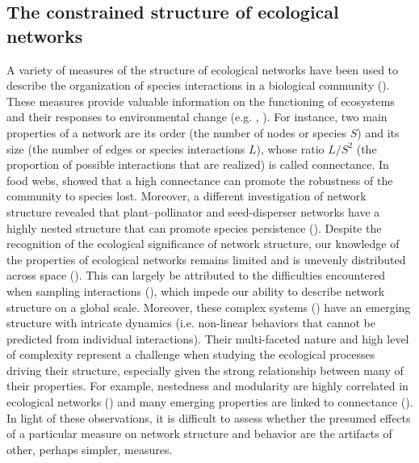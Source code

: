 
\subsection{The constrained structure of ecological networks}

A variety of measures of the structure of ecological networks have been used to
describe the organization of species interactions in a biological community
(\cite{Delmas2019Analysing}). These measures provide valuable information on the
functioning of ecosystems and their responses to environmental change (e.g.
\cite{Pascual2006Ecological}, \cite{Gomez2011Functional}). For instance, two main
properties of a network are its order (the number of nodes or species $S$) and
its size (the number of edges or species interactions $L$), whose ratio $L/S^2$
(the proportion of possible interactions that are realized) is called
connectance. In food webs, \textcite{Dunne2002Network} showed that a high
connectance can promote the robustness of the community to species lost.
Moreover, a different investigation of network structure revealed that
plant–pollinator and seed-disperser networks have a highly nested structure that
can promote species persistence (\cite{Bascompte2003Nested}). Despite the
recognition of the ecological significance of network structure, our knowledge
of the properties of ecological networks remains limited and is unevenly
distributed across space (\cite{Poisot2021Global}). This can largely be
attributed to the difficulties encountered when sampling interactions
(\cite{Jordano2016Sampling}), which impede our ability to describe network
structure on a global scale. Moreover, these complex systems
(\cite{Williams2000Simple}) have an emerging structure with intricate dynamics
(i.e. non-linear behaviors that cannot be predicted from individual
interactions). Their multi-faceted nature and high level of complexity represent
a challenge when studying the ecological processes driving their structure,
especially given the strong relationship between many of their properties. For
example, nestedness and modularity are highly correlated in ecological networks
(\cite{Fortuna2010Nestedness}) and many emerging properties are linked to
connectance (\cite{Poisot2014When}). In light of these observations, it is
difficult to assess whether the presumed effects of a particular measure on
network structure and behavior are the artifacts of other, perhaps simpler,
measures.

